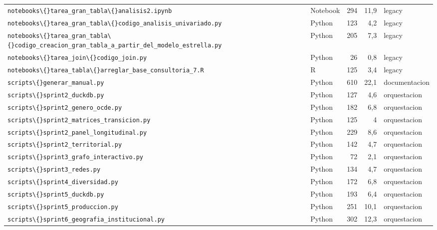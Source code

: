 \begin{longtable}{>{\raggedright\arraybackslash}p{6.2cm} l rr >{\raggedright\arraybackslash}p{3.0cm}}
    \texttt{notebooks\textbackslash\{\}tarea\_gran\_tabla\textbackslash\{\}analisis2.ipynb} & Notebook & 294 & 11,9 & legacy \\
    \texttt{notebooks\textbackslash\{\}tarea\_gran\_tabla\textbackslash\{\}codigo\_analisis\_univariado.py} & Python & 123 & 4,2 & legacy \\
    \texttt{notebooks\textbackslash\{\}tarea\_gran\_tabla\textbackslash\{\}codigo\_creacion\_gran\_tabla\_a\_partir\_del\_modelo\_estrella.py} & Python & 205 & 7,3 & legacy \\
    \texttt{notebooks\textbackslash\{\}tarea\_join\textbackslash\{\}codigo\_join.py} & Python & 26 & 0,8 & legacy \\
    \texttt{notebooks\textbackslash\{\}tarea\_tabla\textbackslash\{\}arreglar\_base\_consultoria\_7.R} & R & 125 & 3,4 & legacy \\
    \texttt{scripts\textbackslash\{\}generar\_manual.py} & Python & 610 & 22,1 & documentacion \\
    \texttt{scripts\textbackslash\{\}sprint2\_duckdb.py} & Python & 127 & 4,6 & orquestacion \\
    \texttt{scripts\textbackslash\{\}sprint2\_genero\_ocde.py} & Python & 182 & 6,8 & orquestacion \\
    \texttt{scripts\textbackslash\{\}sprint2\_matrices\_transicion.py} & Python & 125 & 4 & orquestacion \\
    \texttt{scripts\textbackslash\{\}sprint2\_panel\_longitudinal.py} & Python & 229 & 8,6 & orquestacion \\
    \texttt{scripts\textbackslash\{\}sprint2\_territorial.py} & Python & 142 & 4,7 & orquestacion \\
    \texttt{scripts\textbackslash\{\}sprint3\_grafo\_interactivo.py} & Python & 72 & 2,1 & orquestacion \\
    \texttt{scripts\textbackslash\{\}sprint3\_redes.py} & Python & 134 & 4,7 & orquestacion \\
    \texttt{scripts\textbackslash\{\}sprint4\_diversidad.py} & Python & 172 & 6,8 & orquestacion \\
    \texttt{scripts\textbackslash\{\}sprint5\_duckdb.py} & Python & 193 & 6,4 & orquestacion \\
    \texttt{scripts\textbackslash\{\}sprint5\_produccion.py} & Python & 251 & 10,1 & orquestacion \\
    \texttt{scripts\textbackslash\{\}sprint6\_geografia\_institucional.py} & Python & 302 & 12,3 & orquestacion \\

\end{longtable}
